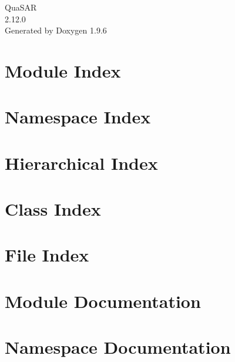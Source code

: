 \documentclass[twoside]{book}
\newcommand{\+}{\discretionary{\mbox{\scriptsize$\hookleftarrow$}}{}{}}
\newcommand{\clearemptydoublepage}{%
    \newpage{\pagestyle{empty}\cleardoublepage}%
  }
\begin{document}
  \raggedbottom
    \hypersetup{pageanchor=false,
                bookmarksnumbered=true,
                pdfencoding=unicode
               }
  \begin{titlepage}
  \vspace*{7cm}
  \begin{center}%
  {\Large Qua\+SAR}\\
  [1ex]\large 2.\+12.\+0 \\
  \vspace*{1cm}
  {\large Generated by Doxygen 1.9.6}\\
  \end{center}
  \end{titlepage}
  \clearemptydoublepage
  \tableofcontents
  \clearemptydoublepage
  \hypersetup{pageanchor=true}
\chapter{Module Index}

\chapter{Namespace Index}

\chapter{Hierarchical Index}

\chapter{Class Index}

\chapter{File Index}

\chapter{Module Documentation}





\chapter{Namespace Documentation}








\end{document}
